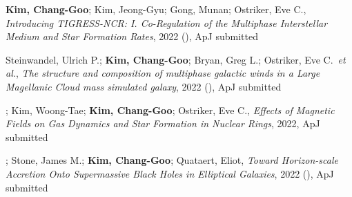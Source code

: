\item \textbf{Kim, Chang-Goo}; Kim, Jeong-Gyu; Gong, Munan; Ostriker, Eve C., \textit{Introducing TIGRESS-NCR: I. Co-Regulation of the Multiphase Interstellar Medium and Star Formation Rates}, 2022 (), ApJ submitted
\item Steinwandel, Ulrich P.; \textbf{Kim, Chang-Goo}; Bryan, Greg L.; Ostriker, Eve C.~\textit{et al.}, \textit{The structure and composition of multiphase galactic winds in a Large Magellanic Cloud mass simulated galaxy}, 2022 (), ApJ submitted
\item {}; Kim, Woong-Tae; \textbf{Kim, Chang-Goo}; Ostriker, Eve C., \textit{Effects of Magnetic Fields on Gas Dynamics and Star Formation in Nuclear Rings}, 2022, ApJ submitted
\item {}; Stone, James M.; \textbf{Kim, Chang-Goo}; Quataert, Eliot, \textit{Toward Horizon-scale Accretion Onto Supermassive Black Holes in Elliptical Galaxies}, 2022 (), ApJ submitted
